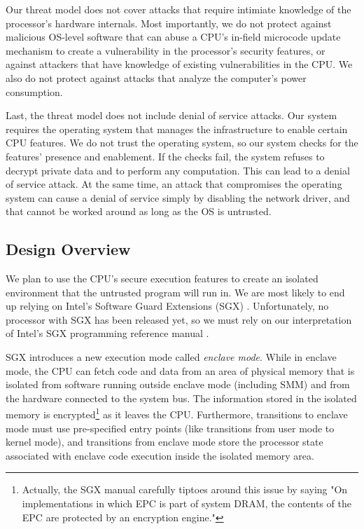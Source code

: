Our threat model does not cover attacks that require intimiate knowledge of the
processor's hardware internals. Most importantly, we do not protect against
malicious OS-level software that can abuse a CPU's in-field microcode update
mechanism to create a vulnerability in the processor's security features, or
against attackers that have knowledge of existing vulnerabilities in the CPU.
We also do not protect against attacks that analyze the computer's power
consumption.

Last, the threat model does not include denial of service attacks. Our system
requires the operating system that manages the infrastructure to enable certain
CPU features. We do not trust the operating system, so our system checks for
the features' presence and enablement. If the checks fail, the system refuses
to decrypt private data and to perform any computation. This can lead to a
denial of service attack. At the same time, an attack that compromises the
operating system can cause a denial of service simply by disabling the network
driver, and that cannot be worked around as long as the OS is untrusted.

\subsection{Design Overview}
\label{sec:overview}

We plan to use the CPU's secure execution features to create an isolated
environment that the untrusted program will run in. We are most likely to end
up relying on Intel's Software Guard Extensions (SGX) \cite{anati2013sgx}.
Unfortunately, no processor with SGX has been released yet, so we must rely on
our interpretation of Intel's SGX programming reference manual
\cite{intel2013sgxmanual}.

SGX introduces a new execution mode called \textit{enclave mode}. While in
enclave mode, the CPU can fetch code and data from an area of physical memory
that is isolated from software running outside enclave mode (including SMM) and
from the hardware connected to the system bus. The information stored in the
isolated memory is encrypted\footnote{Actually, the SGX manual carefully
tiptoes around this issue by saying "On implementations in which EPC is part of
system DRAM, the contents of the EPC are protected by an encryption engine."}
as it leaves the CPU. Furthermore, transitions to enclave mode must use
pre-specified entry points (like transitions from user mode to kernel mode),
and transitions from enclave mode store the processor state associated with
enclave code execution inside the isolated memory area.

